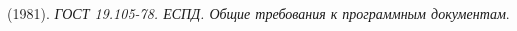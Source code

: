 \documentclass{article}
\begin{document}
\begin{thebibliography}{1}

 (1981). \textit{ГОСТ 19.105-78. ЕСПД. Общие требования к программным документам}.

\end{thebibliography}
\end{document}
